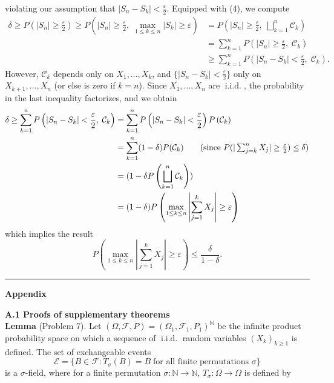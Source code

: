 \documentclass[10pt]{article}
\newcommand{\bp}[1]{\left({#1}\right)}
\newcommand{\mbb}[1]{\mathbb{#1}}
\newcommand{\1}[1]{\mathbbm{1}_{#1}}
\newcommand{\mc}[1]{\mathcal{#1}}
\DeclareMathOperator{\iid}{i.i.d.}
\begin{document}
    violating our assumption that $|S_n-S_k|<\tfrac{\varepsilon}{2}$. Equipped with (4), we compute
    \begin{align*}
        \delta\geq P\bp{\left|S_n\right|\geq\frac{\varepsilon}{2}}\geq P\bp{\left|S_n\right|\geq\frac{\varepsilon}{2},\;\max_{1\leq k\leq n}\left|S_k\right|\geq\varepsilon}&=P\bp{\left|S_n\right|\geq\frac{\varepsilon}{2},\;\bigsqcup_{k=1}^n\mc{C}_k}\\
        &=\sum_{k=1}^nP\bp{\left|S_n\right|\geq\frac{\varepsilon}{2},\; \mc{C}_k}\\
        &\geq \sum_{k=1}^nP\bp{|S_{n}-S_k|<\frac{\varepsilon}{2},\;\mc{C}_k}.\tag{by (4)}
    \end{align*}
    However, $\mc{C}_k$ depends only on $X_1,\dots,X_k$, and $\{|S_n-S_k|<\tfrac{\varepsilon}{2}\}$ only on $X_{k+1},\dots,X_n$ (or else is zero if $k=n$). Since $X_1,\dots,X_n$ are $\iid$, the probability in the last inequality factorizes, and we obtain
    \begin{align*}
        \delta\geq\sum_{k=1}^nP\bp{|S_{n}-S_k|<\frac{\varepsilon}{2},\;\mc{C}_k}&=\sum_{k=1}^nP\bp{|S_n-S_k|<\frac{\varepsilon}{2}}P\bp{\mc{C}_k}\\
        &=\sum_{k=1}^n(1-\delta)P(\mc{C}_k)\tag{since $P(|\sum_{j=k}^nX_j|\geq\tfrac{\varepsilon}{2})\leq\delta$}\\
        &=(1-\delta P\bp{\bigsqcup_{k=1}^n\mc{C}_k})\\
        &=(1-\delta)P\bp{\max_{1\leq k\leq n}\left|\sum_{j=1}^kX_j\right|\geq\varepsilon} 
    \end{align*}
    which implies the result
    \[P\bp{\max_{1\leq k\leq n}\left|\sum_{j=1}^kX_j\right|\geq \varepsilon}\leq \frac{\delta}{1-\delta}.\tag*{$\qed$}\]
    \vspace{10pt}
    \hrule
    \begin{center}
        {\bf\large Appendix}
    \end{center}
    {\bf A.1\hspace{5pt} Proofs of supplementary theorems}\\[5pt]
    {\bf Lemma} (Problem 7). Let $(\Omega,\mc{F},P)=(\Omega_1,\mc{F}_1,P_1)^{\mbb{N}}$ be the infinite product probability space on which a sequence of $\iid$ random variables $(X_k)_{k\geq 1}$ is defined. The set of
    exchangeable events
    \[\mc{E}=\{B\in\mc{F}:T_\sigma(B)=B\;\text{for all finite permutations $\sigma$}\}\]
    is a $\sigma$-field, where for a finite permutation $\sigma:\mbb{N}\rightarrow\mbb{N}$, $T_\sigma:\Omega\rightarrow\Omega$ is defined by
\end{document}

